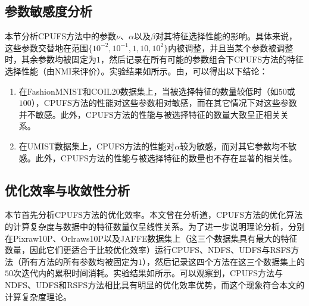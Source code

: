 \subsection{参数敏感度分析}
本节分析CPUFS方法中的参数$\nu$、$\alpha$以及$\beta$对其特征选择性能的影响。具体来说，这些参数交替地在范围$\{10^{-2},10^{-1},1,10,10^{2}\}$内被调整，并且当某个参数被调整时，其余参数均被固定为$1$，然后记录在所有可能的参数组合下CPUFS方法的特征选择性能（由NMI来评价）。实验结果如所示。由，可以得出以下结论：
\begin{enumerate}
\item 在FashionMNIST和COIL20数据集上，当被选择特征的数量较低时（如$50$或$100$），CPUFS方法的性能对这些参数相对敏感，而在其它情况下对这些参数并不敏感。此外，CPUFS方法的性能与被选择特征的数量大致呈正相关关系。
\item 在UMIST数据集上，CPUFS方法的性能对$\alpha$较为敏感，而对其它参数均不敏感。此外，CPUFS方法的性能与被选择特征的数量也不存在显著的相关性。
\end{enumerate}

\subsection{优化效率与收敛性分析}
本节首先分析CPUFS方法的优化效率。本文曾在分析道，CPUFS方法的优化算法的计算复杂度与数据中的特征数量仅呈线性关系。为了进一步说明理论分析，分别在Pixraw10P、Orlraws10P以及JAFFE数据集上（这三个数据集具有最大的特征数量，因此它们更适合于比较优化效率）运行CPUFS、NDFS、UDFS与RSFS方法（所有方法的所有参数均被固定为$1$），然后记录这四个方法在这三个数据集上的$50$次迭代内的累积时间消耗。实验结果如所示。可以观察到，CPUFS方法与NDFS、UDFS和RSFS方法相比具有明显的优化效率优势，而这个现象符合本文的计算复杂度理论。

